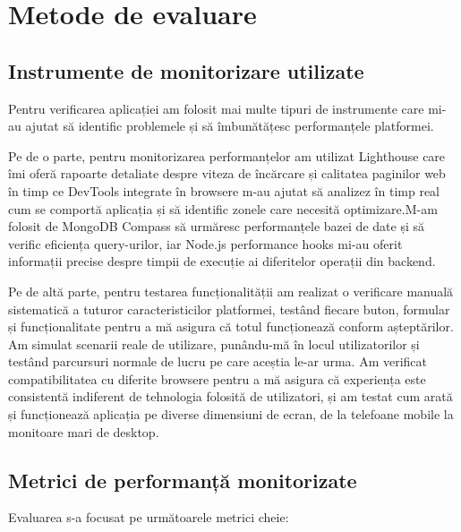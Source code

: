 \documentclass[12pt,a4paper]{report}
\begin{document}
\section{Metode de evaluare}

\subsection{Instrumente de monitorizare utilizate}

Pentru verificarea aplicației am folosit mai multe tipuri de instrumente care mi-au ajutat să identific problemele și să îmbunătățesc performanțele platformei.

Pe de o parte, pentru  monitorizarea performanțelor am utilizat Lighthouse care îmi oferă rapoarte detaliate despre viteza de încărcare și calitatea paginilor web în timp ce DevTools integrate în browsere m-au ajutat să analizez în timp real cum se comportă aplicația și să identific zonele care necesită optimizare.M-am folosit de  MongoDB Compass  să urmăresc performanțele bazei de date și să verific eficiența query-urilor, iar Node.js performance hooks mi-au oferit informații precise despre timpii de execuție ai diferitelor operații din backend.

Pe de altă parte, pentru testarea funcționalității am realizat o verificare manuală sistematică a tuturor caracteristicilor platformei, testând fiecare buton, formular și funcționalitate pentru a mă asigura că totul funcționează conform așteptărilor. Am simulat scenarii reale de utilizare, punându-mă în locul utilizatorilor și testând parcursuri normale de lucru pe care aceștia le-ar urma. Am verificat compatibilitatea cu diferite browsere pentru a mă asigura că experiența este consistentă indiferent de tehnologia folosită de utilizatori, și am testat cum arată și funcționează aplicația pe diverse dimensiuni de ecran, de la telefoane mobile la monitoare mari de desktop.
\subsection{Metrici de performanță monitorizate}

Evaluarea s-a focusat pe următoarele metrici cheie:
\end{document}
